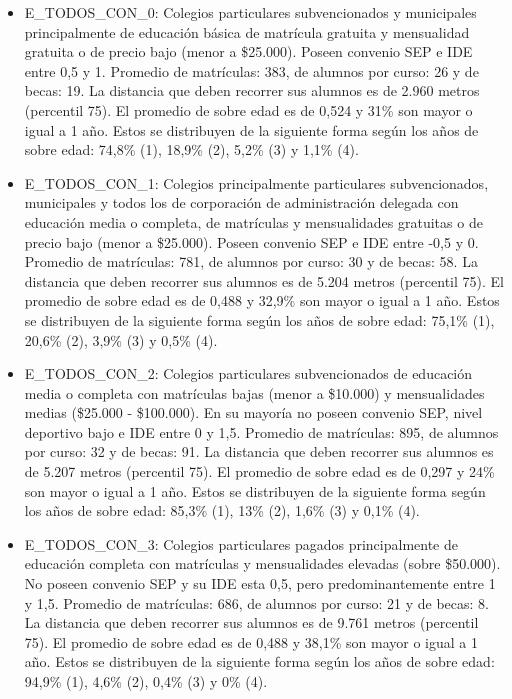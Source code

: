 \begin{itemize}
    \item E\_TODOS\_CON\_0: Colegios particulares subvencionados y municipales principalmente de educación básica de matrícula gratuita y mensualidad gratuita o de precio bajo (menor a \$25.000). Poseen convenio SEP e IDE entre 0,5 y 1. Promedio de matrículas: 383, de alumnos por curso: 26 y de becas: 19. La distancia que deben recorrer sus alumnos es de 2.960 metros (percentil 75). El promedio de sobre edad es de 0,524 y 31\% son mayor o igual a 1 año. Estos se distribuyen de la siguiente forma según los años de sobre edad: 74,8\% (1), 18,9\% (2), 5,2\% (3) y 1,1\% (4).
    \item E\_TODOS\_CON\_1: Colegios principalmente particulares subvencionados, municipales y todos los de corporación de administración delegada con educación media o completa, de matrículas y mensualidades gratuitas o de precio bajo (menor a \$25.000). Poseen convenio SEP e IDE entre -0,5 y 0. Promedio de matrículas: 781, de alumnos por curso: 30 y de becas: 58. La distancia que deben recorrer sus alumnos es de 5.204 metros (percentil 75). El promedio de sobre edad es de 0,488 y 32,9\% son mayor o igual a 1 año. Estos se distribuyen de la siguiente forma según los años de sobre edad: 75,1\% (1), 20,6\% (2), 3,9\% (3) y 0,5\% (4).
    \item E\_TODOS\_CON\_2: Colegios particulares subvencionados de educación media o completa con matrículas bajas (menor a \$10.000) y mensualidades medias (\$25.000 - \$100.000). En su mayoría no poseen convenio SEP, nivel deportivo bajo e IDE entre 0 y 1,5. Promedio de matrículas: 895, de alumnos por curso: 32 y de becas: 91. La distancia que deben recorrer sus alumnos es de 5.207 metros (percentil 75). El promedio de sobre edad es de 0,297 y 24\% son mayor o igual a 1 año. Estos se distribuyen de la siguiente forma según los años de sobre edad: 85,3\% (1), 13\% (2), 1,6\% (3) y 0,1\% (4).
    \item E\_TODOS\_CON\_3: Colegios particulares pagados principalmente de educación completa con matrículas y mensualidades elevadas (sobre \$50.000). No poseen convenio SEP y su IDE esta 0,5, pero predominantemente entre 1 y 1,5. Promedio de matrículas: 686, de alumnos por curso: 21 y de becas: 8. La distancia que deben recorrer sus alumnos es de 9.761 metros (percentil 75). El promedio de sobre edad es de 0,488 y 38,1\% son mayor o igual a 1 año. Estos se distribuyen de la siguiente forma según los años de sobre edad: 94,9\% (1), 4,6\% (2), 0,4\% (3) y 0\% (4).
\end{itemize}

